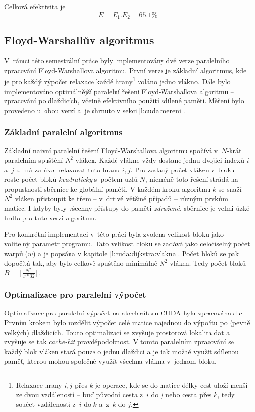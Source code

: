 

Celková efektivita je 
$$ E = E_1 . E_2 = 65.1 \% $$




\subsection{Floyd-Warshallův algoritmus}
V~rámci této semestrální práce byly implementovány dvě verze paralelního zpracování Floyd-Warshallova algoritmu. 
První verze je základní algoritmus, kde je pro každý výpočet relaxace každé hrany\footnote{Relaxace hrany $i,j$ přes $k$ je operace, 
kde se do matice délky cest uloží menší ze dvou vzdáleností -- buď původní cesta z~$i$ do $j$ nebo cesta
přes $k$, tedy součet vzdáleností z~$i$ do $k$ a~z~$k$ do $j$.} voláno jedno vlákno. Dále bylo implementováno 
optimálnější paralelní řešení Floyd-Warshallova algoritmu -- zpracování po dlaždicích, včetně efektivního použití sdílené paměti.
Měření bylo provedeno u~obou verzí a~je shrnuto v sekci \ref{l:cuda:mereni}.

\subsubsection{Základní paralelní algoritmus}
Základní naivní paralelní řešení Floyd-Warshallova algoritmu spočívá v~$N$-krát paralelním spuštění $N^2$ vláken. 
Každé vlákno vždy dostane jednu dvojici indexů $i$ a~$j$ a~má za úkol relaxovat tuto hranu $i,j$. Pro zadaný počet vláken
v~bloku roste počet bloků \emph{kvadraticky} s~počtem uzlů $N$, nicméně toto řešení strádá na propustnosti sběrnice
ke globální paměti. V každém kroku algoritmu $k$ se snaží $N^2$ vláken přistoupit ke třem -- v~drtivé většině případů -- 
různým prvkům matice. I kdyby byly všechny přístupy do paměti \emph{združené}, sběrnice je velmi úzké hrdlo pro tuto verzi
algoritmu.


Pro konkrétní implementaci v~této práci byla zvolena velikost bloku jako volitelný parametr programu. Tato velikost bloku se zadává
jako celočíselný počet warpů ($w$) a je popsána v kapitole \ref{l:cuda:dijkstra:vlakna}.
Počet bloků se pak dopočítá tak, aby bylo celkově spuštěno minimálně $N^2$ vláken. Tedy počet bloků $B = \lceil \frac{N^2}{w*32} \rceil$.

\subsubsection{Optimalizace pro paralelní výpočet} \label{l:cuda:optimalizace}
Optimalizace pro paralelní výpočet na akcelerátoru CUDA byla zpracována dle \cite{w:fw:cuda}. Prvním krokem bylo rozdělit výpočet  celé matice najednou do výpočtu po (pevně velkých) dlaždicích. Touto optimalizací se zvyšuje prostorová lokalita dat a zvyšuje se tak \emph{cache-hit} pravděpodobnost. V tomto paralelním zpracování se každý blok vláken stará pouze o jednu dlaždici a je tak možné využít sdílenou paměť, kterou mohou společně využít všechna vlákna v~jednom bloku.

